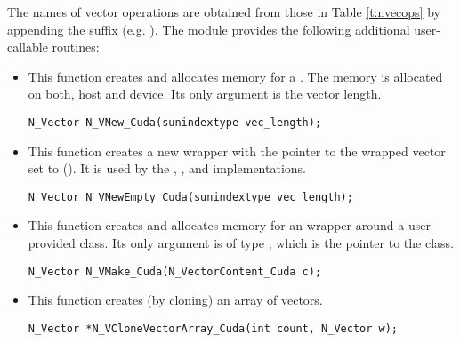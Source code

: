 The names of vector operations are obtained from those in 
Table \ref{t:nvecops} by appending the suffix  (e.g. ).
The module {\nveccuda}  provides the following additional user-callable routines:
\begin{itemize}

  

\item {}
 
  This function creates and allocates memory for a {\cuda} .
  The memory is allocated on both, host and device. Its only argument is the 
  vector length. 

\begin{verbatim}
N_Vector N_VNew_Cuda(sunindextype vec_length);
\end{verbatim}

  

\item {}
 
  This function creates a new {\nvector} wrapper with the pointer to
  the wrapped {\cuda} vector set to (). It is used by the 
  , , and  
  implementations. 

\begin{verbatim}
N_Vector N_VNewEmpty_Cuda(sunindextype vec_length);
\end{verbatim}

  

\item {}
  
  This function creates and allocates memory for an {\nveccuda}
  wrapper around a user-provided  class. 
  Its only argument is of type , which
  is the pointer to the class.

\begin{verbatim}
N_Vector N_VMake_Cuda(N_VectorContent_Cuda c);
\end{verbatim}



\item {}
 
  This function creates (by cloning) an array of  {\nveccuda} vectors.
 
\begin{verbatim}
N_Vector *N_VCloneVectorArray_Cuda(int count, N_Vector w);
\end{verbatim}


\end{itemize}
